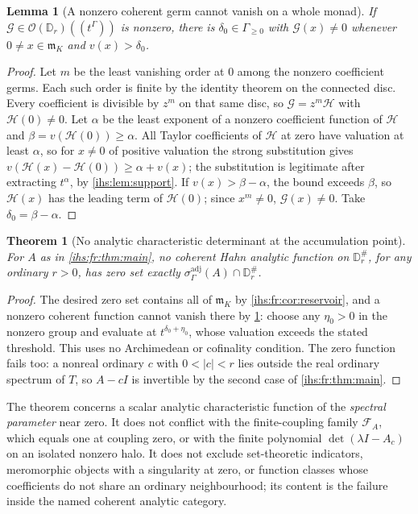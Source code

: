 \documentclass[11pt,a4paper]{article}
\numberwithin{equation}{section}
\newtheorem{theorem}{Theorem}[section]
\newtheorem{lemma}[lemma]{Lemma}
\theoremstyle{definition}
\theoremstyle{remark}
\newcommand{\mK}{\mathfrak m_K}
\newcommand{\abs}[1]{\lvert#1\rvert}
\begin{document}
\begin{lemma}[A nonzero coherent germ cannot vanish on a whole monad]\label{ihs:fr:lem:nonvanishing}
If $\mathcal G\in\mathcal O(\mathbb D_r)((t^\Gamma))$ is nonzero, there is
$\delta_0\in\Gamma_{\ge0}$ with $\mathcal G(x)\ne0$ whenever $0\ne x\in\mK$
and $v(x)>\delta_0$.
\end{lemma}
\begin{proof}
Let $m$ be the least vanishing order at $0$ among the nonzero coefficient
germs. Each such order is finite by the identity theorem on the connected
disc. Every coefficient is divisible by $z^m$ on that same disc, so $\mathcal G=z^m\mathcal H$
with $\mathcal H(0)\ne0$. Let $\alpha$ be the least exponent of a nonzero
coefficient function of $\mathcal H$ and $\beta=v(\mathcal H(0))\ge\alpha$.
All Taylor coefficients of $\mathcal H$ at zero have valuation at least
$\alpha$, so for $x\ne0$ of positive valuation the strong substitution gives
$v(\mathcal H(x)-\mathcal H(0))\ge\alpha+v(x)$; the substitution is legitimate
after extracting $t^\alpha$, by \cref{ihs:lem:support}. If
$v(x)>\beta-\alpha$, the bound exceeds $\beta$, so $\mathcal H(x)$ has the
leading term of $\mathcal H(0)$; since $x^m\ne0$, $\mathcal G(x)\ne0$. Take
$\delta_0=\beta-\alpha$.
\end{proof}

\begin{theorem}[No analytic characteristic determinant at the accumulation point]\label{ihs:fr:thm:nocharacteristic}
For $A$ as in \cref{ihs:fr:thm:main}, no coherent Hahn analytic function on
$\mathbb D_r^\#$, for any ordinary $r>0$, has zero set exactly
$\sigma^{\mathrm{adj}}_\Gamma(A)\cap\mathbb D_r^\#$.
\end{theorem}
\begin{proof}
The desired zero set contains all of $\mK$ by \cref{ihs:fr:cor:reservoir},
and a nonzero coherent function cannot vanish there by
\cref{ihs:fr:lem:nonvanishing}: choose any $\eta_0>0$ in the nonzero group
and evaluate at $t^{\delta_0+\eta_0}$, whose valuation exceeds the stated
threshold. This uses no Archimedean or cofinality condition.
The zero function fails too: a nonreal
ordinary $c$ with $0<\abs c<r$ lies outside the real ordinary spectrum of
$T$, so $A-cI$ is invertible by the second case of \cref{ihs:fr:thm:main}.
\end{proof}

The theorem concerns a scalar analytic characteristic function of the
\emph{spectral parameter} near zero. It does not conflict with the
finite-coupling family $\mathcal F_A$, which equals one at coupling zero, or
with the finite polynomial $\det(\lambda I-A_c)$ on an isolated nonzero halo.
It does not exclude set-theoretic indicators, meromorphic objects with a
singularity at zero, or function classes whose coefficients do not share an
ordinary neighbourhood; its content is the failure inside the named coherent
analytic category.
\end{document}
